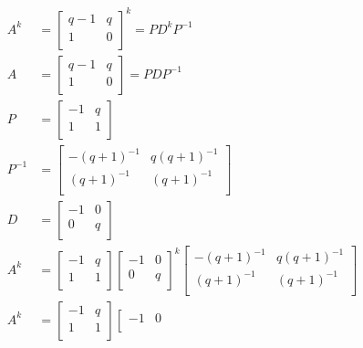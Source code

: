 \documentclass[paper.tex]{subfiles}
\begin{document}
\begin{align*}
A^{k} &=
\left[ \begin{array}{ccc}
q-1 & q \\
1 & 0 \\
\end{array} \right] ^{k}
=
PD^{k}P^{-1} \\
A &=
\left[ \begin{array}{ccc}
q-1 & q \\
1 & 0 \\
\end{array} \right]
=
PDP^{-1} \\
P &=
\left[ \begin{array}{ccc}
-1 & q \\
1 & 1 \\
\end{array} \right] \\
P^{-1} &=
\left[ \begin{array}{ccc}
-(q+1)^{-1} & q(q+1)^{-1} \\
(q+1)^{-1} & (q+1)^{-1} \\
\end{array} \right] \\
D &=
\left[ \begin{array}{ccc}
-1 & 0 \\
0 & q \\
\end{array} \right] \\
A^{k}
&=
\left[ \begin{array}{ccc}
-1 & q \\
1 & 1 \\
\end{array} \right]
\left[ \begin{array}{ccc}
-1 & 0 \\
0 & q \\
\end{array} \right] ^{k}
\left[ \begin{array}{ccc}
-(q+1)^{-1} & q(q+1)^{-1} \\
(q+1)^{-1} & (q+1)^{-1} \\
\end{array} \right] \\
A^{k}
&=
\left[ \begin{array}{ccc}
-1 & q \\
1 & 1 \\
\end{array} \right]
\left[ \begin{array}{ccc}
-1 & 0 \\

\end{array}
\end{align*}
\end{document}
